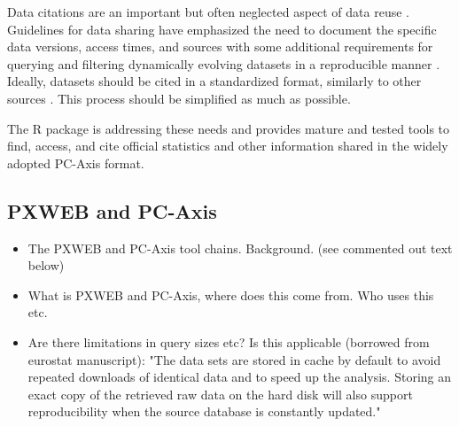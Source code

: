 
Data citations are an important but often neglected aspect of data reuse \citep{Bornatici2023, Vannan2020}. Guidelines for data sharing have emphasized the need to document the specific data versions, access times, and sources \citep{Bornatici2023, DCSG11} with some additional requirements for querying and filtering dynamically evolving datasets in a reproducible manner \citep{Rauber2015, Rauber2021}. Ideally, datasets should be cited in a standardized format, similarly to other sources \citep{Bornatici2023}. This process should be simplified as much as possible.


The  R package is addressing these needs and provides
mature and tested tools to find, access, and cite official statistics
and other information shared in the widely adopted PC-Axis format.


\subsection[PXWEB and PC-Axis]{PXWEB and PC-Axis}

\begin{itemize}
    \item The PXWEB and PC-Axis tool chains. Background. (see commented out text below)
    \item What is PXWEB and PC-Axis, where does this come from. Who uses this etc.
    \item Are there limitations in query sizes etc? Is this applicable (borrowed from eurostat manuscript): "The data sets are stored in cache by default to avoid repeated downloads of identical data and to speed up the analysis. Storing an exact copy of the retrieved raw data on the hard disk will also support reproducibility when the source database is constantly updated."
\end{itemize}


